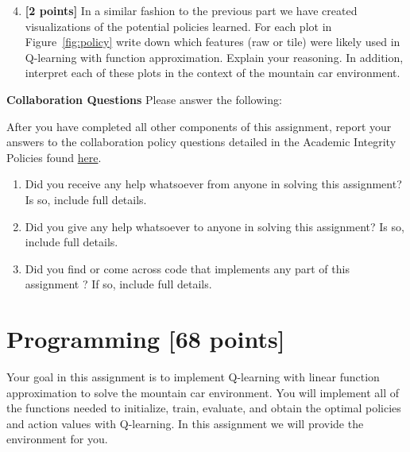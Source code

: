 \documentclass[11pt]{article}
\numberwithin{equation}{section} %
\numberwithin{figure}{section} %
\numberwithin{table}{section} %
\newcommand{\points}[1]{{\bf [#1 points]}}
\begin{document}
\begin{enumerate}
\setcounter{enumi}{3}
\item \textbf{[2 points]} In a similar fashion to the previous part we have created visualizations of the potential policies learned. For each plot in Figure~\ref{fig:policy} write down which features (raw or tile) were likely used in Q-learning with function approximation. Explain your reasoning. In addition, interpret each of these plots in the context of the mountain car environment.
    
\begin{tcolorbox}[fit,height=4cm, width=\linewidth, blank, borderline={1pt}{-2pt},nobeforeafter]
\end{tcolorbox}

\end{enumerate}

\clearpage
\textbf{Collaboration Questions} Please answer the following:


    After you have completed all other components of this assignment, report your answers to the collaboration policy questions detailed in the Academic Integrity Policies found \href{http://www.cs.cmu.edu/~mgormley/courses/10601/about.html#7-academic-integrity-policies}{here}.
    \begin{enumerate}
        \item Did you receive any help whatsoever from anyone in solving this assignment? Is so, include full details.
        \item Did you give any help whatsoever to anyone in solving this assignment? Is so, include full details.
        \item Did you find or come across code that implements any part of this assignment ? If so, include full details.
    \end{enumerate}
    
\begin{tcolorbox}[fit,height=14cm, width=\linewidth, blank, borderline={1pt}{-2pt},nobeforeafter]
     
\end{tcolorbox}\clearpage
\section{Programming \points{68}}
\label{sec:code}

Your goal in this assignment is to implement Q-learning with linear function approximation to solve the mountain car environment. You will implement all of the functions needed to initialize, train, evaluate, and obtain the optimal policies and action values with Q-learning. In this assignment we will provide the environment for you.
\end{document}
